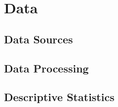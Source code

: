 \section{Data}

\subsection{Data Sources}

\subsection{Data Processing}

\subsection{Descriptive Statistics}
